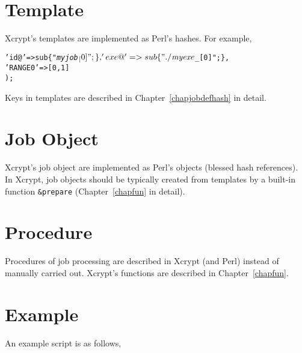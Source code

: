 \documentclass[a4paper,10pt]{report}
\begin{document}
\section{Template}

Xcrypt's templates are implemented as Perl's hashes.  For example,
\begin{boxnote}
\begin{alltt}
%myjob = (
    'id@' => sub \{ "\textit{myjob}$_[0]"; \},
    'exe@' => sub \{ "./\textit{myexe} $_[0]"; \},
    'RANGE0' => [0,1]
);
\end{alltt}
\end{boxnote}
\vspace{\baselineskip}

Keys in templates are described in Chapter~\ref{chapjobdefhash} in
detail.

\section{Job Object}

Xcrypt's job object are implemented as Perl's objects (blessed hash
references).  In Xcrypt, job objects should be typically created from
templates by a built-in function \texttt{\&prepare}
(Chapter~\ref{chapfun} in detail).


\section{Procedure}

Procedures of job processing are described in Xcrypt (and Perl)
instead of manually carried out.
Xcrypt's functions are described in Chapter~\ref{chapfun}.

\section{Example}\label{secscriptexample}

An example script is as follows,
\end{document}
